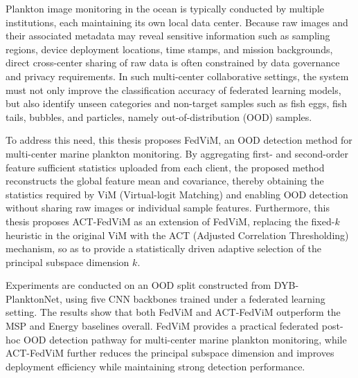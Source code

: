 \begin{abstract*}
Plankton image monitoring in the ocean is typically conducted by multiple institutions, each maintaining its own local data center. Because raw images and their associated metadata may reveal sensitive information such as sampling regions, device deployment locations, time stamps, and mission backgrounds, direct cross-center sharing of raw data is often constrained by data governance and privacy requirements. In such multi-center collaborative settings, the system must not only improve the classification accuracy of federated learning models, but also identify unseen categories and non-target samples such as fish eggs, fish tails, bubbles, and particles, namely out-of-distribution (OOD) samples.

To address this need, this thesis proposes FedViM, an OOD detection method for multi-center marine plankton monitoring. By aggregating first- and second-order feature sufficient statistics uploaded from each client, the proposed method reconstructs the global feature mean and covariance, thereby obtaining the statistics required by ViM (Virtual-logit Matching) and enabling OOD detection without sharing raw images or individual sample features. Furthermore, this thesis proposes ACT-FedViM as an extension of FedViM, replacing the fixed-$k$ heuristic in the original ViM with the ACT (Adjusted Correlation Thresholding) mechanism, so as to provide a statistically driven adaptive selection of the principal subspace dimension $k$.

Experiments are conducted on an OOD split constructed from DYB-PlanktonNet, using five CNN backbones trained under a federated learning setting. The results show that both FedViM and ACT-FedViM outperform the MSP and Energy baselines overall. FedViM provides a practical federated post-hoc OOD detection pathway for multi-center marine plankton monitoring, while ACT-FedViM further reduces the principal subspace dimension and improves deployment efficiency while maintaining strong detection performance.

\end{abstract*}
